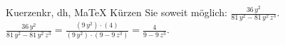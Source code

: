 \begin{MAufgabe}{Kuerzen}{kr, dh, MaTeX}
K\"urzen Sie soweit m\"oglich: $\frac{36\, y^2}{81\, y^2 - 81\, y^2\, z^3}$.\\ 
\ifLsg\MLoesung
\quad $\frac{36\, y^2}{81\, y^2 - 81\, y^2\, z^3}=\frac{(9\, y^2)\cdot(4)}{(9\, y^2)\cdot(9 - 9\, z^3)}=\frac{4}{9 - 9\, z^3}$.\else\relax\fi
 \end{MAufgabe}